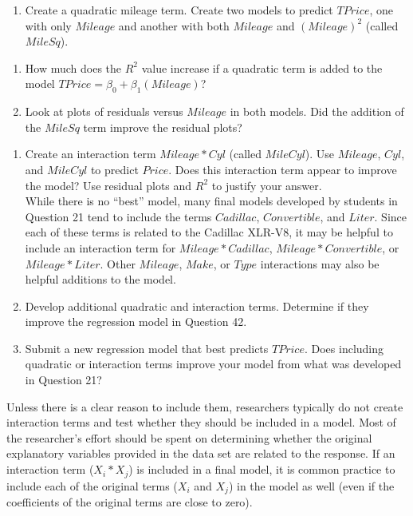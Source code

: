 \documentclass[
]{report}
\providecommand{\tightlist}{%
  \setlength{\itemsep}{0pt}\setlength{\parskip}{0pt}}
\begin{document}
\begin{enumerate}
\def\labelenumi{\arabic{enumi}.}
\setcounter{enumi}{40}
\tightlist
\item
  Create a quadratic mileage term. Create two models to predict \(TPrice\), one with only \(Mileage\) and another with both \(Mileage\) and \((Mileage)^2\) (called \(MileSq\)).
\end{enumerate}

\begin{enumerate}
\def\labelenumi{\alph{enumi}.}
\tightlist
\item
  How much does the \(R^2\) value increase if a quadratic term is added to the model \(TPrice = \beta_0 + \beta_1(Mileage)\)?
\item
  Look at plots of residuals versus \(Mileage\) in both models. Did the addition of the \(MileSq\) term improve the residual plots?
\end{enumerate}

\begin{enumerate}
\def\labelenumi{\arabic{enumi}.}
\setcounter{enumi}{41}
\item
  Create an interaction term \(Mileage*Cyl\) (called \(MileCyl\)). Use \(Mileage\), \(Cyl\), and \(MileCyl\) to predict \(Price\). Does this interaction term appear to improve the model? Use residual plots and \(R^2\) to justify your answer.\\
  While there is no ``best'' model, many final models developed by students in Question 21 tend to include the terms \(Cadillac\), \(Convertible\), and \(Liter\). Since each of these terms is related to the Cadillac XLR-V8, it may be helpful to include an interaction term for \(Mileage*Cadillac\), \(Mileage*Convertible\), or \(Mileage*Liter\). Other \(Mileage\), \(Make\), or \(Type\) interactions may also be helpful additions to the model.
\item
  Develop additional quadratic and interaction terms. Determine if they improve the regression model in Question 42.
\item
  Submit a new regression model that best predicts \(TPrice\). Does including quadratic or interaction terms improve your model from what was developed in Question 21?
\end{enumerate}

Unless there is a clear reason to include them, researchers typically do not create interaction terms and test whether they should be included in a model. Most of the researcher's effort should be spent on determining whether the original explanatory variables provided in the data set are related to the response. If an interaction term (\(X_i * X_j\)) is included in a final model, it is common practice to include each of the original terms (\(X_i\) and \(X_j\)) in the model as well (even if the coefficients of the original terms are close to zero).
\end{document}
